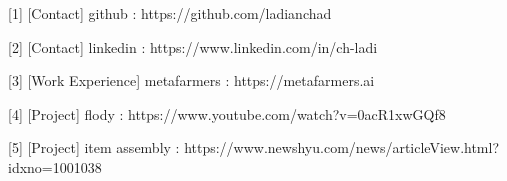 \documentclass{article}
\begin{document}



\vfill

\color{gray}[1] [Contact] github : \hfill https://github.com/ladianchad

\color{gray}[2] [Contact] linkedin : \hfill https://www.linkedin.com/in/ch-ladi

\color{gray}[3] [Work Experience] metafarmers : \hfill https://metafarmers.ai

\color{gray}[4] [Project] flody : \hfill https://www.youtube.com/watch?v=0acR1xwGQf8

\color{gray}[5] [Project] item assembly : \hfill https://www.newshyu.com/news/articleView.html?idxno=1001038
\end{document}
